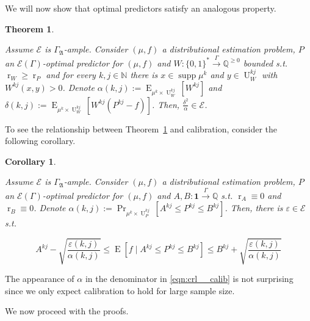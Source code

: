 \documentclass{article}
\numberwithin{equation}{section}
\theoremstyle{definition}
\theoremstyle{plain}
\newtheorem{theorem}{Theorem}[section]
\newtheorem{corollary}{Corollary}[section]
\newcommand{\Bool}{\{0,1\}}
\newcommand{\Words}{{\Bool^*}}
\DeclareMathOperator{\Supp}{supp}
\DeclareMathOperator{\Prb}{Pr}
\DeclareMathOperator{\E}{E}
\DeclareMathOperator{\R}{r}
\DeclareMathOperator{\U}{U}
\newcommand{\Nats}{\mathbb{N}}
\newcommand{\Rats}{\mathbb{Q}}
\newcommand{\GrowA}{\Gamma_{\mathfrak{A}}}
\newcommand{\Fall}{\mathcal{E}}
\newcommand{\Scheme}{\xrightarrow{\Gamma}}
\begin{document}
We will now show that optimal predictors satisfy an analogous property.

\begin{theorem}
\label{thm:calib}

Assume $\Fall$ is $\GrowA$-ample. Consider $(\mu,f)$ a distributional estimation problem, $P$ an $\Fall(\Gamma)$-optimal predictor for $(\mu,f)$ and ${W: \Words \Scheme \Rats^{\geq 0}}$ bounded s.t. $\R_W \geq \R_P$ and for every $k,j \in \Nats$ there is $x \in \Supp \mu^k$ and $y \in \U_W^{kj}$ with $W^{kj}(x,y) > 0$. Denote ${\alpha(k,j):=\E_{\mu^k \times \U_W^{kj}}[W^{kj}]}$ and ${\delta(k,j):=\E_{\mu^k \times \U_W^{kj}}[W^{kj}(P^{kj}-f)]}$. Then, $\frac{\delta^2}{\alpha} \in \Fall$.

\end{theorem}

To see the relationship between Theorem~\ref{thm:calib} and calibration, consider the following corollary.

\begin{corollary}
\label{crl:calib}

Assume $\Fall$ is $\GrowA$-ample. Consider $(\mu,f)$ a distributional estimation problem, $P$ an $\Fall(\Gamma)$-optimal predictor for $(\mu,f)$ and $A,B: \bm{1} \Scheme \Rats$ s.t. $\R_A \equiv 0$ and $\R_B \equiv 0$. Denote ${\alpha(k,j):=\Prb_{\mu^k \times \U_P^{kj}}[A^{kj} \leq P^{kj} \leq B^{kj}]}$. Then, there is $\varepsilon \in \Fall$ s.t. 

\begin{equation}
\label{eqn:crl__calib}
A^{kj} - \sqrt{\frac{\varepsilon(k,j)}{\alpha(k,j)}} \leq \E[f \mid A^{kj} \leq P^{kj} \leq B^{kj}] \leq B^{kj} + \sqrt{\frac{\varepsilon(k,j)}{\alpha(k,j)}}
\end{equation}

\end{corollary}

The appearance of $\alpha$ in the denominator in \ref{eqn:crl__calib} is not surprising since we only expect calibration to hold for large sample size.

We now proceed with the proofs.
\end{document}
